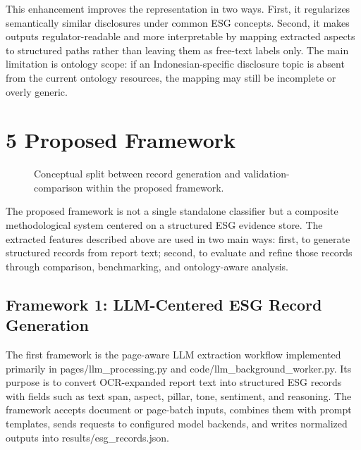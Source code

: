 This enhancement improves the representation in two ways. First, it regularizes semantically similar disclosures under common ESG concepts. Second, it makes outputs regulator-readable and more interpretable by mapping extracted aspects to structured paths rather than leaving them as free-text labels only. The main limitation is ontology scope: if an Indonesian-specific disclosure topic is absent from the current ontology resources, the mapping may still be incomplete or overly generic.

\section{5 Proposed Framework}

\begin{figure}[ht]
\begin{center}
\end{center}
\caption{Conceptual split between record generation and validation-comparison within the proposed framework.}
\label{fig:implementation-framework}
\end{figure}

The proposed framework is not a single standalone classifier but a composite methodological system centered on a structured ESG evidence store. The extracted features described above are used in two main ways: first, to generate structured records from report text; second, to evaluate and refine those records through comparison, benchmarking, and ontology-aware analysis.

\subsection{Framework 1: LLM-Centered ESG Record Generation}

The first framework is the page-aware LLM extraction workflow implemented primarily in pages/llm\_processing.py and code/llm\_background\_worker.py. Its purpose is to convert OCR-expanded report text into structured ESG records with fields such as text span, aspect, pillar, tone, sentiment, and reasoning. The framework accepts document or page-batch inputs, combines them with prompt templates, sends requests to configured model backends, and writes normalized outputs into results/esg\_records.json.

